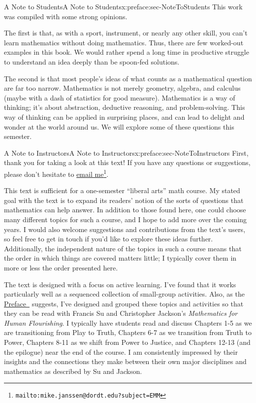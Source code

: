 \documentclass[oneside,10pt,]{book}
\numberwithin{equation}{section}
\begin{document}
\begin{preface}{A Note to Students}{}{A Note to Students}{}{}{x:preface:sec-NoteToStudents}
This work was compiled with some strong opinions.%
\par
The first is that, as with a sport, instrument, or nearly any other skill, you can't learn mathematics without doing mathematics. Thus, there are few worked-out examples in this book. We would rather spend a long time in productive struggle to understand an idea deeply than be spoon-fed solutions.%
\par
The second is that most people's ideas of what counts as a mathematical question are far too narrow. Mathematics is not merely geometry, algebra, and calculus (maybe with a dash of statistics for good measure). Mathematics is a way of thinking; it's about abstraction, deductive reasoning, and problem-solving. This way of thinking can be applied in surprising places, and can lead to delight and wonder at the world around us. We will explore some of these questions this semester.%
\end{preface}
%
%
\typeout{************************************************}
\typeout{************************************************}
%
\begin{preface}{A Note to Instructors}{}{A Note to Instructors}{}{}{x:preface:sec-NoteToInstructors}
First, thank you for taking a look at this text! If you have any questions or suggestions, please don't hesitate to \href{mailto:mike.janssen@dordt.edu?subject=EMM}{email me}\footnote{\nolinkurl{mailto:mike.janssen@dordt.edu?subject=EMM}\label{g:fn:idp105544742313872}}.%
\par
This text is sufficient for a one-semester ``liberal arts'' math course. My stated goal with the text is to expand its readers' notion of the sorts of questions that mathematics can help answer. In addition to those found here, one could choose many different topics for such a course, and I hope to add more over the coming years. I would also welcome suggestions and contributions from the text's users, so feel free to get in touch if you'd like to explore these ideas further. Additionally, the independent nature of the topics in such a course means that the order in which things are covered matters little; I typically cover them in more or less the order presented here.%
\par
The text is designed with a focus on active learning. I've found that it works particularly well as a sequenced collection of small-group activities. Also, as the \hyperref[x:preface:Sec-Introduction]{Preface~} suggests, I've designed and grouped these topics and activities so that they can be read with Francis Su and Christopher Jackson's \emph{Mathematics for Human Flourishing}. I typically have students read and discuss Chapters 1-5 as we are transitioning from Play to Truth, Chapters 6-7 as we transition from Truth to Power, Chapters 8-11 as we shift from Power to Justice, and Chapters 12-13 (and the epilogue) near the end of the course. I am consistently impressed by their insights and the connections they make between their own major disciplines and mathematics as described by Su and Jackson.%
\end{preface}
\end{document}
